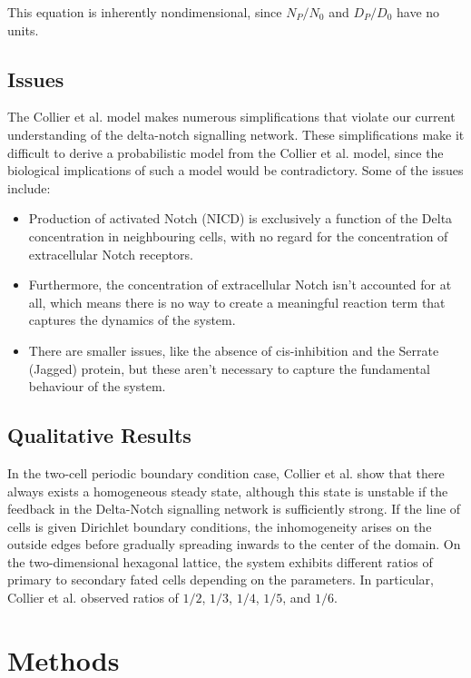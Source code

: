 \documentclass{article}
\begin{document}
\begin{flushleft}
This equation is inherently nondimensional, since $N_{P} / N_{0}$ and $D_{P} / D_{0}$ have no units.

\subsection{Issues}

The Collier et al. model makes numerous simplifications that violate our current understanding of the delta-notch signalling network. These simplifications make it difficult to derive a probabilistic model from the Collier et al. model, since the biological implications of such a model would be contradictory. Some of the issues include:

\begin{itemize}
  \item Production of activated Notch (NICD) is exclusively a function of the Delta concentration in neighbouring cells, with no regard for the concentration of extracellular Notch receptors.
  \item Furthermore, the concentration of extracellular Notch isn't accounted for at all, which means there is no way to create a meaningful reaction term that captures the dynamics of the system.
  \item There are smaller issues, like the absence of cis-inhibition and the Serrate (Jagged) protein, but these aren't necessary to capture the fundamental behaviour of the system.
\end{itemize}

\subsection{Qualitative Results}

In the two-cell periodic boundary condition case, Collier et al. show that there always exists a homogeneous steady state, although this state is unstable if the feedback in the Delta-Notch signalling network is sufficiently strong. If the line of cells is given Dirichlet boundary conditions, the inhomogeneity arises on the outside edges before gradually spreading inwards to the center of the domain. On the two-dimensional hexagonal lattice, the system exhibits different ratios of primary to secondary fated cells depending on the parameters. In particular, Collier et al. observed ratios of $1/2$, $1/3$, $1/4$, $1/5$, and $1/6$.

\section{Methods}


\end{flushleft}
\end{document}
